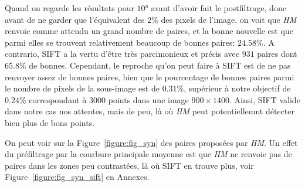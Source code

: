 \documentclass[
	a4paper, %
	10pt, %
	unnumberedsections, %
	twoside, %
]{LTJournalArticle}
\begin{document}
Quand on regarde les résultats pour $10$° avant d'avoir fait le postfiltrage, donc avant de ne garder que l'équivalent des $2\%$ des pixels de l'image,
on voit que \textit{HM} renvoie comme attendu un grand nombre de paires, et la bonne nouvelle est que parmi elles se trouvent relativement beaucoup
de bonnes paires: $24.58\%$. A contrario, SIFT a la vertu d'être très parcimonieux et précis avec $931$ paires dont $65.8\%$ de bonnes.
Cependant, le reproche qu'on peut faire à SIFT est de ne pas renvoyer assez de bonnes paires, bien que le pourcentage de bonnes paires
parmi le nombre de pixels de la sous-image est de $0.31\%$, supérieur à notre objectif de $0.24\%$ correspondant à 3000 points dans une
image $900 \times 1400$. Ainsi, SIFT valide dans notre cas nos attentes, mais de peu, là où \textit{HM} peut potentiellemnt détecter bien
plus de bons points.

On peut voir sur la Figure~\ref{figure:fig_syn} des paires proposées par \textit{HM}.
Un effet du préfiltrage par la courbure principale moyenne est que \textit{HM} ne renvoie pas
de paires dans les zones peu contrastées, là où SIFT en trouve plus, voir Figure~\ref{figure:fig_syn_sift}
en Annexes.
\end{document}
